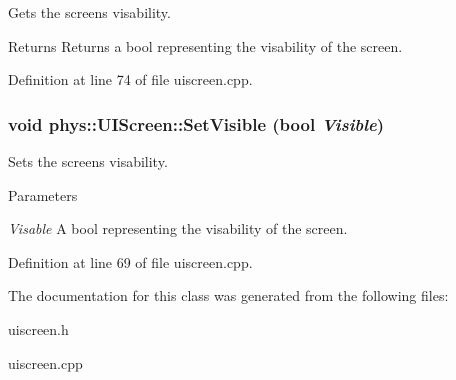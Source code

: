 Gets the screens visability. 

\begin{DoxyReturn}{Returns}
Returns a bool representing the visability of the screen. 
\end{DoxyReturn}


Definition at line 74 of file uiscreen.cpp.

\hypertarget{classphys_1_1UIScreen_ac8b143b35fd96e9aed694089d2732396}{
\subsubsection[{SetVisible}]{\setlength{\rightskip}{0pt plus 5cm}void phys::UIScreen::SetVisible (bool {\em Visible})}}
\label{d9/de8/classphys_1_1UIScreen_ac8b143b35fd96e9aed694089d2732396}


Sets the screens visability. 


\begin{DoxyParams}{Parameters}
\item[{\em Visable}]A bool representing the visability of the screen. \end{DoxyParams}


Definition at line 69 of file uiscreen.cpp.



The documentation for this class was generated from the following files:\begin{DoxyCompactItemize}
\item 
uiscreen.h\item 
uiscreen.cpp\end{DoxyCompactItemize}
